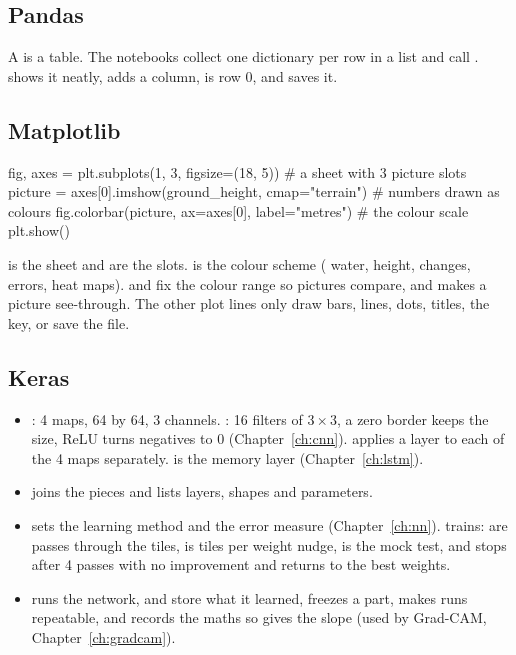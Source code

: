 \subsection{Pandas}\label{py:pandas}
A  is a table. The notebooks collect one dictionary per row in a list and call .  shows it neatly,  adds a column,  is row 0, and  saves it.

\subsection{Matplotlib}\label{py:plots}
\begin{pycode}
fig, axes = plt.subplots(1, 3, figsize=(18, 5))      # a sheet with 3 picture slots
picture = axes[0].imshow(ground_height, cmap="terrain")  # numbers drawn as colours
fig.colorbar(picture, ax=axes[0], label="metres")    # the colour scale
plt.show()
\end{pycode}
 is the sheet and  are the slots.  is the colour scheme ( water,  height,  changes,  errors,  heat maps).  and  fix the colour range so pictures compare, and  makes a picture see-through. The other plot lines only draw bars, lines, dots, titles, the key, or save the file.

\subsection{Keras}\label{py:keras}
\begin{itemize}
\item {}: 4 maps, 64 by 64, 3 channels. : 16 filters of $3\times3$, a zero border keeps the size, ReLU turns negatives to 0 (Chapter~\ref{ch:cnn}).  applies a layer to each of the 4 maps separately.  is the memory layer (Chapter~\ref{ch:lstm}).\item {} joins the pieces and  lists layers, shapes and parameters.
\item {} sets the learning method and the error measure (Chapter~\ref{ch:nn}).  trains:  are passes through the tiles,  is tiles per weight nudge,  is the mock test, and  stops after 4 passes with no improvement and returns to the best weights.
\item {} runs the network,  and  store what it learned,  freezes a part,  makes runs repeatable, and  records the maths so  gives the slope (used by Grad-CAM, Chapter~\ref{ch:gradcam}).
\end{itemize}
